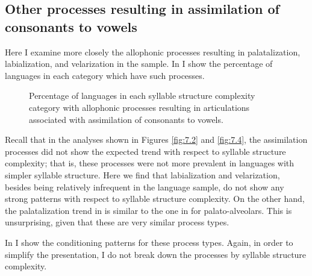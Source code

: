 \subsection{Other processes resulting in assimilation of consonants to vowels}\label{sec:7.3.3}

  Here I examine more closely the allophonic processes resulting in palatalization, labialization, and velarization in the sample. In  I show the percentage of languages in each category which have such processes.

\begin{figure}
\caption{\label{fig:7.7}Percentage of languages in each syllable structure complexity category with allophonic processes resulting in articulations associated with assimilation of consonants to vowels.}
\end{figure}
  Recall that in the analyses shown in Figures \ref{fig:7.2} and \ref{fig:7.4}, the assimilation processes did not show the expected trend with respect to syllable structure complexity; that is, these processes were not more prevalent in languages with simpler syllable structure. Here we find that labialization and velarization, besides being relatively infrequent in the language sample, do not show any strong patterns with respect to syllable structure complexity. On the other hand, the palatalization trend in  is similar to the one in  for palato-alveolars. This is unsurprising, given that these are very similar process types.

  In  I show the conditioning patterns for these process types. Again, in order to simplify the presentation, I do not break down the processes by syllable structure complexity.

